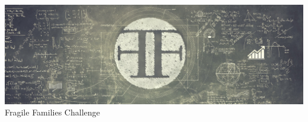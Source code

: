 \documentclass[aspectratio=169]{beamer}
\begin{document}
\begin{frame}

\begin{center}
\includegraphics[width=\textwidth]{figures/ffc_masthead}
\Large{Fragile Families Challenge}
\end{center}

\end{frame}
\end{document}
